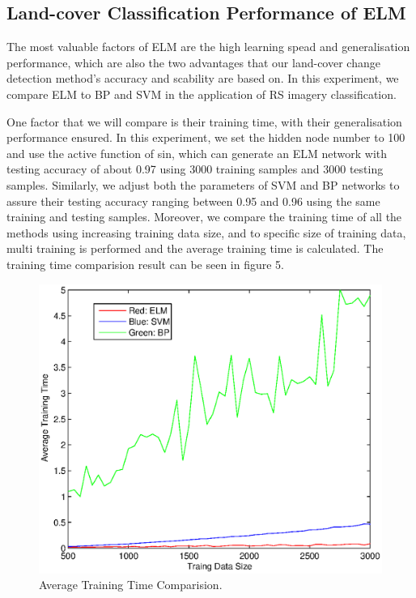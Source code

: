 \documentclass{elsart}
\begin{document}
\subsection{Land-cover Classification Performance of ELM}
The most valuable factors of ELM are the high learning spead and generalisation performance, which are also the two advantages that our land-cover change detection method's accuracy and scability are based on.
In this experiment, we compare ELM to BP and SVM in the application of RS imagery classification. 
\par

One factor that we will compare is their training time, with their generalisation performance ensured.
In this experiment, we set the hidden node number to 100 and use the active function of sin, which can generate an ELM network with testing accuracy of about 0.97 using 3000 training samples and 3000 testing samples.
Similarly, we adjust both the parameters of SVM and BP networks to assure their testing accuracy ranging between 0.95 and 0.96 using the same training and testing samples.
Moreover, we compare the training time of all the methods using increasing training data size, and to specific size of training data, multi training is performed and the average training time is calculated.
The training time comparision result can be seen in figure 5.
\begin{figure}[tbh]
\begin{center}
\includegraphics[width=15cm]{tt.eps}
\caption{Average Training Time Comparision. }
\label{method}
\end{center}
\end{figure}
\par
\end{document}
